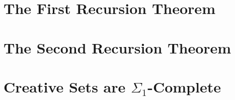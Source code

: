 \section{The First Recursion Theorem}
\section{The Second Recursion Theorem}
\section{Creative Sets are $\Sigma_1$-Complete}